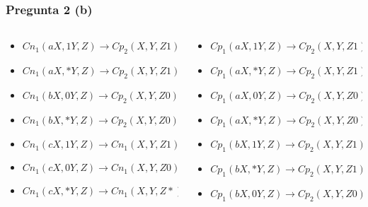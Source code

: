 \documentclass{beamer}
\begin{document}
\begin{frame}
    \frametitle{Pregunta 2 (b)}
    
    \begin{columns}
        \begin{column}{0.48\textwidth}
            \begin{itemize}
                \item $Cn_1(aX,1Y,Z) \to Cp_2(X,Y,Z1)$
                \item $Cn_1(aX,*Y,Z) \to Cp_2(X,Y,Z1)$
                \item $Cn_1(bX,0Y,Z) \to Cp_2(X,Y,Z0)$
                \item $Cn_1(bX,*Y,Z) \to Cp_2(X,Y,Z0)$
                \item $Cn_1(cX,1Y,Z) \to Cn_1(X,Y,Z1)$
                \item $Cn_1(cX,0Y,Z) \to Cn_1(X,Y,Z0)$
                \item $Cn_1(cX,*Y,Z) \to Cn_1(X,Y,Z*)$
            \end{itemize}
        \end{column}
        \begin{column}{0.48\textwidth}
            \begin{itemize}
                \item $Cp_1(aX,1Y,Z) \to Cp_2(X,Y,Z1)$
                \item $Cp_1(aX,*Y,Z) \to Cp_2(X,Y,Z1)$
                \item $Cp_1(aX,0Y,Z) \to Cp_2(X,Y,Z0)$
                \item $Cp_1(aX,*Y,Z) \to Cp_2(X,Y,Z0)$
                \item $Cp_1(bX,1Y,Z) \to Cp_2(X,Y,Z1)$
                \item $Cp_1(bX,*Y,Z) \to Cp_2(X,Y,Z1)$
                \item $Cp_1(bX,0Y,Z) \to Cp_2(X,Y,Z0)$
                      
            \end{itemize}
        \end{column}
    \end{columns}
\end{frame}
\end{document}
